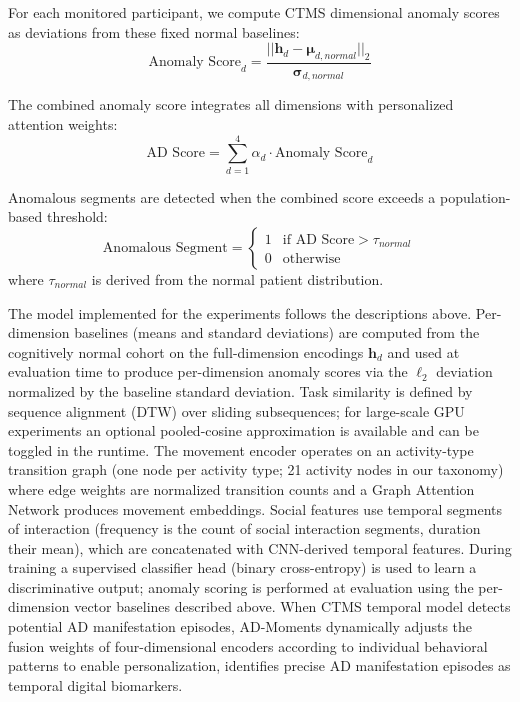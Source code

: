 \documentclass[sigconf, anonymous, 9pt, nonacm]{acmart}
\newcommand{\sys}{AD-Moments\xspace}
\begin{document}
For each monitored participant, we compute CTMS dimensional anomaly scores as deviations from these fixed normal baselines:
\begin{equation*}
\text{Anomaly Score}_d = \frac{||\mathbf{h}_d - \boldsymbol{\mu}_{d,normal}||_2}{\boldsymbol{\sigma}_{d,normal}}
\end{equation*}

The combined anomaly score integrates all dimensions with personalized attention weights:
\begin{equation*}
\text{AD Score} = \sum_{d=1}^{4} \alpha_d \cdot \text{Anomaly Score}_d
\end{equation*}

Anomalous segments are detected when the combined score exceeds a population-based threshold:
\begin{equation*}
\text{Anomalous Segment} = \begin{cases}
1 & \text{if AD Score} > \tau_{normal} \\
0 & \text{otherwise}
\end{cases}
\end{equation*}
where $\tau_{normal}$ is derived from the normal patient distribution.

The model implemented for the experiments follows the descriptions above. Per-dimension baselines (means and standard deviations)
are computed from the cognitively normal cohort on the full-dimension encodings $\mathbf{h}_d$ and used at evaluation time to
produce per-dimension anomaly scores via the $\ell_2$ deviation normalized by the baseline standard deviation. Task similarity
is defined by sequence alignment (DTW) over sliding subsequences; for large-scale GPU experiments an optional pooled-cosine
approximation is available and can be toggled in the runtime. The movement encoder operates on an activity-type transition
graph (one node per activity type; 21 activity nodes in our taxonomy) where edge weights are normalized transition counts and a
Graph Attention Network produces movement embeddings. Social features use temporal segments of interaction (frequency is the
count of social interaction segments, duration their mean), which are concatenated with CNN-derived temporal features. During
training a supervised classifier head (binary cross-entropy) is used to learn a discriminative output; anomaly scoring is
performed at evaluation using the per-dimension vector baselines described above.
When CTMS temporal model detects potential AD manifestation episodes, \sys dynamically adjusts the fusion weights of four-dimensional encoders according to individual behavioral patterns to enable personalization, identifies precise AD manifestation episodes as temporal digital biomarkers.
\end{document}
